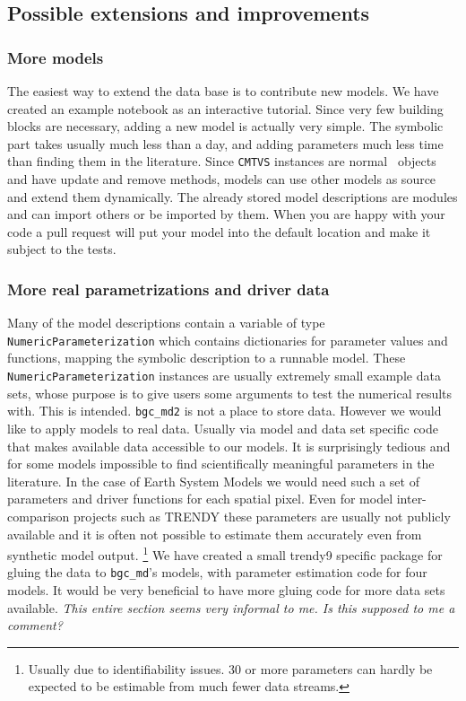 \subsection{Possible extensions and improvements}
\subsubsection{More models}
The easiest way to extend the data base is to contribute new models.
We have created an example notebook as an interactive tutorial.
Since very few building blocks are necessary, adding a new model is actually very simple.
The symbolic part takes usually much less than a day, 
and adding parameters much less time than finding them in the literature.
Since \texttt{CMTVS} instances are normal \python\ objects and have update and remove methods, models can use other models as source and extend them dynamically.
The already stored model descriptions are \python{} modules and can import others or be imported by them.
When you are happy with your code  a pull request will put your model into the default location 
and make it subject to the tests. 
\subsubsection{More real parametrizations and driver data}
Many of the model descriptions contain a variable of type \texttt{NumericParameterization} 
which contains dictionaries for parameter values and functions, mapping the symbolic description to a runnable model.
These \texttt{NumericParameterization} instances are usually extremely small example data sets, whose purpose is to give users some arguments to test the numerical results with.
This is intended. \texttt{bgc\_md2} is not a place to store data.
However we would like to apply models to real data. Usually via model and data set specific code that makes available data accessible to our models.
It is surprisingly tedious  and for some models impossible to find scientifically meaningful parameters in the literature.
In the case of Earth System Models we would need such a set of parameters and driver functions for each spatial pixel.
Even for model inter-comparison projects such as TRENDY \cite{sitch_recent_2015} these parameters are usually not publicly available and it is 
often not possible to estimate them accurately even from synthetic model output. 
\footnote{
  Usually due to identifiability issues. 
  30 or more parameters can hardly be expected to be estimable from much fewer data streams.
}
We have created a small trendy9 specific package for gluing the data to \texttt{bgc\_md}'s models, with parameter estimation code for four models.
It would be very beneficial to have more gluing code for more data sets available.
\emph{This entire section seems very informal to me. Is this supposed to me a comment?}


